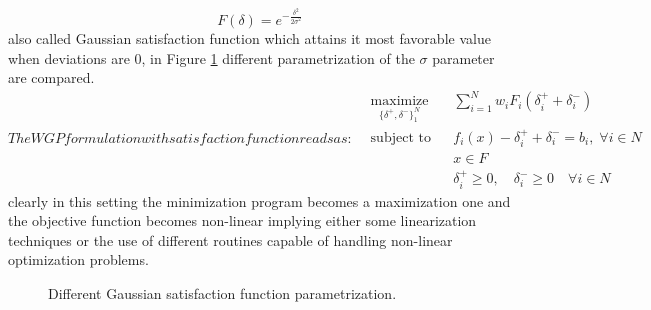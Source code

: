 \documentclass[conference,final,]{IEEEtran}
\begin{document}
$$
F(\delta) = e^{-\frac{\delta^2}{2\sigma^2}}
$$
also called Gaussian satisfaction function which attains it most favorable value when deviations are 0, in Figure \ref{s-function} different parametrization of the $\sigma$ parameter are compared.
\begin{subequations}
The WGP formulation with satisfaction function reads as:
\begin{align}
    & \underset{\{\delta^+,\delta^-\}^N_1}{\text{maximize}} & & \sum^N_{i=1}w_i F_i(\delta^+_i + \delta^-_i) \label{fwgpmin} \\
    & \text{subject to} & & f_i(x) - \delta^+_i + \delta^-_i=b_i, \; \forall i \in N \label{fwgpsoftgoal} \\
    & & & x\in F \label{fwgphardgoal}\\
    & & & \delta^+_i\geq 0, \quad \delta^-_i\geq 0 \quad \forall i \in N \label{fwgppositivity}
\end{align}
\end{subequations}
clearly in this setting the minimization program becomes a maximization one and the objective function becomes non-linear implying either some linearization techniques or the use of different routines capable of handling non-linear optimization problems.
\begin{figure}[]
\centering
{}
\caption{Different Gaussian satisfaction function parametrization.}
\label{s-function}
\end{figure}
\end{document}
